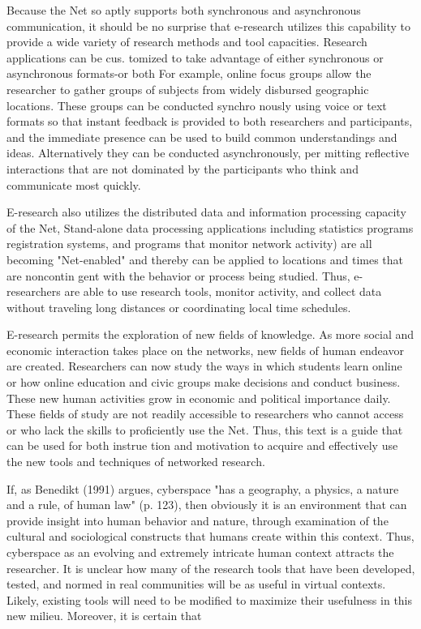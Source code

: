 \documentclass[a4, 11pt]{article}
\begin{document}
Because the Net so aptly supports both synchronous and asynchronous communication, it should be no surprise that e-research utilizes this capability to provide a wide variety of research methods and tool capacities. Research applications can be cus. tomized to take advantage of either synchronous or asynchronous formats-or both For example, online focus groups allow the researcher to gather groups of subjects from widely disbursed geographic locations. These groups can be conducted synchro nously using voice or text formats so that instant feedback is provided to both researchers and participants, and the immediate presence can be used to build common understandings and ideas. Alternatively they can be conducted asynchronously, per mitting reflective interactions that are not dominated by the participants who think and communicate most quickly.

E-research also utilizes the distributed data and information processing capacity of the Net, Stand-alone data processing applications including statistics programs registration systems, and programs that monitor network activity) are all becoming "Net-enabled" and thereby can be applied to locations and times that are noncontin gent with the behavior or process being studied. Thus, e-researchers are able to use research tools, monitor activity, and collect data without traveling long distances or coordinating local time schedules.

E-research permits the exploration of new fields of knowledge. As more social and economic interaction takes place on the networks, new fields of human endeavor are created. Researchers can now study the ways in which students learn online or how online education and civic groups make decisions and conduct business. These new human activities grow in economic and political importance daily. These fields of study are not readily accessible to researchers who cannot access or who lack the skills to proficiently use the Net. Thus, this text is a guide that can be used for both instrue tion and motivation to acquire and effectively use the new tools and techniques of networked research.

If, as Benedikt (1991) argues, cyberspace "has a geography, a physics, a nature and a rule, of human law" (p. 123), then obviously it is an environment that can provide insight into human behavior and nature, through examination of the cultural and sociological constructs that humans create within this context. Thus, cyberspace as an evolving and extremely intricate human context attracts the researcher. It is unclear how many of the research tools that have been developed, tested, and normed in real communities will be as useful in virtual contexts. Likely, existing tools will need to be modified to maximize their usefulness in this new milieu. Moreover, it is certain that
\end{document}
